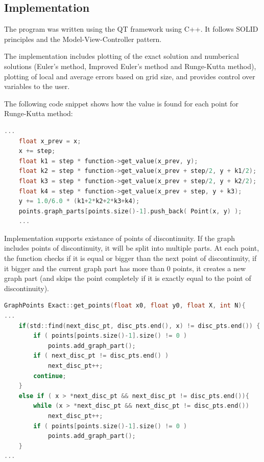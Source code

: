 \documentclass[12pt]{article}
\begin{document}
\subsection*{Implementation}

    The program was written using the QT framework using C++. It follows 
SOLID principles and the Model-View-Controller pattern. 

The implementation includes plotting of the exact solution and numberical
solutions (Euler's method, Improved Euler's method and Runge-Kutta method),
plotting of local and average errors based on grid size, and provides control over 
variables to the user.

The following code snippet shows how the value is found for each point for Runge-Kutta method:
\begin{lstlisting}[language=C++]
    ...
    float x_prev = x;
    x += step;
    float k1 = step * function->get_value(x_prev, y);
    float k2 = step * function->get_value(x_prev + step/2, y + k1/2);
    float k3 = step * function->get_value(x_prev + step/2, y + k2/2);
    float k4 = step * function->get_value(x_prev + step, y + k3);
    y += 1.0/6.0 * (k1+2*k2+2*k3+k4);
    points.graph_parts[points.size()-1].push_back( Point(x, y) );
    ...
\end{lstlisting}

Implementation supports existance of points of discontinuity.
If the graph includes points of discontinuity, it will be split into multiple 
parts.
At each point, the function checks if it is equal or bigger than the next point 
of discontinuity, if it bigger and the current graph part has more than 0 points,
it creates a new graph part (and skips the point completely
if it is exactly equal to the point of discontinuity).

\begin{lstlisting}[language=C]
GraphPoints Exact::get_points(float x0, float y0, float X, int N){
...
    if(std::find(next_disc_pt, disc_pts.end(), x) != disc_pts.end()) {
        if ( points[points.size()-1].size() != 0 )
            points.add_graph_part();
        if ( next_disc_pt != disc_pts.end() )
            next_disc_pt++;
        continue;
    }
    else if ( x > *next_disc_pt && next_disc_pt != disc_pts.end()){
        while (x > *next_disc_pt && next_disc_pt != disc_pts.end())
            next_disc_pt++;
        if ( points[points.size()-1].size() != 0 )
            points.add_graph_part();
    }
...
\end{lstlisting}
\end{document}
